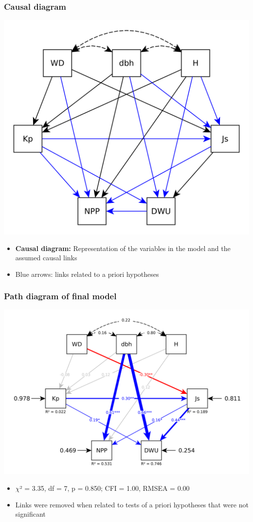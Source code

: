 \documentclass[usepdftitle=false]{beamer}
\newenvironment{changemargin}[2]{%
	\begin{list}{}{%
			\setlength{\topsep}{0pt}%
			\setlength{\leftmargin}{#1}%
			\setlength{\rightmargin}{#2}%
			\setlength{\listparindent}{\parindent}%
			\setlength{\itemindent}{\parindent}%
			\setlength{\parsep}{\parskip}%
		}%
		\item[]}
	{\end{list}
}
\begin{document}
\begin{frame}
	\frametitle{Causal diagram}
	\begin{changemargin}{-2em}{-2em}
		\centering
	\includegraphics[height = 0.6\textheight]{figures/SEMartyna_03_causal_diagram.png}
		\begin{itemize}
			\item<alert@1> \textbf{Causal diagram:} Representation of the variables in the model and the assumed causal links
			\item<2-| alert@2> Blue arrows: links related to a priori hypotheses
		\end{itemize}
	\end{changemargin}
\end{frame}

\begin{frame}
	\frametitle{Path diagram of final model}
	\centering
	\includegraphics[height = 0.65\textheight]{figures/SEMartyna_04_path_diagram.png}
	\begin{itemize}[<+-| alert@+>]
		\item $\chi$² = 3.35, df = 7, p = 0.850; CFI = 1.00, RMSEA = 0.00
		\item Links were removed when related to tests of a priori hypotheses that were not significant 
	\end{itemize}
\end{frame}
\end{document}
